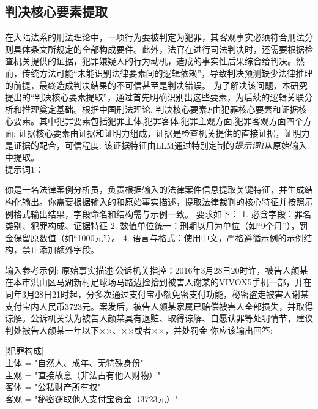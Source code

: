 \subsection{\heiti 判决核心要素提取}
在大陆法系的刑法理论中，一项行为要被判定为犯罪，其客观事实必须符合刑法分则具体条文所规定的全部构成要件。此外，法官在进行司法判决时，还需要根据检查机关提供的证据，犯罪嫌疑人的行为动机，造成的事实性后果综合给判决。然而，传统方法可能“未能识别法律要素间的逻辑依赖”，导致判决预测缺少法律推理的前提，最终造成判决结果的不可信甚至是判决错误。
为了解决该问题，本研究提出的“判决核心要素提取”，通过首先明确识别出这些要素，为后续的逻辑关联分析和推理奠定基础。根据中国刑法理论, 判决核心要素$F$由犯罪核心要素和证据核心要素。其中犯罪要素包括犯罪主体,犯罪客体,犯罪主观方面,犯罪客观方面四个方面;
证据核心要素由证据和证明力组成，证据是检查机关提供的直接证据，证明力是证据的配合，可信程度. 该证据特征由LLM通过特别定制的\textit{提示词1}从原始输入中提取。
\\
提示词1：

你是一名法律案例分析员，负责根据输入的法律案件信息提取关键特征，并生成结构化输出。你需要根据输入的和原始事实描述，提取法律裁判的核心特征并按照示例格式输出结果，字段命名和结构需与示例一致。
要求如下：
1. 必含字段：罪名类别、犯罪构成、证据特征
2. 数值单位统一：刑期以月为单位（如“9个月”），罚金保留原数值（如“1000元”）。
4. 语言与格式：使用中文，严格遵循示例的示例结构，禁止添加额外字段。

输入参考示例:
原始事实描述:公诉机关指控：2016年3月28日20时许，被告人颜某在本市洪山区马湖新村足球场马路边捡拾到被害人谢某的VIVOX5手机一部，并在同年3月28日21时起，分多次通过支付宝小额免密支付功能，秘密盗走被害人谢某支付宝内人民币3723元。案发后，被告人颜某家属已赔偿被害人全部损失，并取得谅解。公诉机关认为被告人颜某具有退赃、取得谅解、自愿认罪等处罚情节，建议判处被告人颜某一年以下××、××或者××，并处罚金
你应该输出回答:

[犯罪构成]
\\
主体 = "自然人、成年、无特殊身份"
\\
主观 = "直接故意（非法占有他人财物）"
\\
客体 = "公私财产所有权"
\\
客观 = "秘密窃取他人支付宝资金（3723元）"

